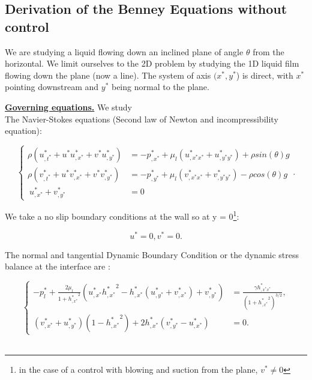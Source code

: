 \documentclass[12pt]{article}
\begin{document}
\subsection{Derivation of the Benney Equations without control}

We are studying a liquid flowing down an inclined plane of angle $\theta$ from the horizontal. We limit ourselves to 
the 2D problem by studying the 1D liquid film flowing down the plane (now a line). 
The system of axis $(x^*, y^*$) is direct, with $x^*$ pointing downstream and $y^*$ being normal to the plane. 

\vspace{0.5cm}
{\underline{\textbf{Governing equations.}}}
We study\\ 

The Navier-Stokes equations (Second law of Newton and incompressibility equation):

\begin{equation}
\left\{
\begin{aligned}
    \rho(u^*_{,t^*}+u^*u^*_{,x^*}+v^*u^*_{,y^*}) &= -p^*_{,x^*} + \mu_l(u^*_{,x^*x^*} + u^*_{,y^*y^*}) + \rho sin(\theta)g\\
    \rho(v^*_{,t^*}+u^*v^*_{,x^*}+v^*v^*_{,y^*}) &= -p^*_{,y^*} + \mu_l(v^*_{,x^*x^*} + v^*_{,y^*y^*}) - \rho cos(\theta)g\\\
    u^*_{,x^*} + v^*_{,y^*} &= 0 \quad 
\end{aligned}
\right. .
\end{equation}

We take a no slip boundary conditions at the wall so at y = 0\footnote{in the case of a control with blowing and suction from the plane, $v^*\neq 0$ }: 

\begin{equation}
    u^*=0, v^*=0.
\end{equation} 

The normal and tangential Dynamic Boundary Condition or the dynamic stress balance at the interface are : 

\begin{equation}
\left\{
\begin{aligned}
-p^*_l + \frac{2\mu_l}{1+{h^*_{,x^*}}^2}(u^*_{,x^*}{h^*_{,x^*}}^2 - h^*_{,x^*}(u^*_{,y^*} + v^*_{,x^*})+v^*_{,y^*}) &= \frac{\gamma h^*_{,x^*x^*}}{(1+{h^*_{,x^*}}^2)^{3/2}},\\
(v^*_{,x^*} + u^*_{,y^*})(1-{h^*_{,x^*}}^2)+2h^*_{,x^*}(v^*_{,y^*}-u^*_{,x^*})&=0.
\end{aligned}
\right.
\end{equation}
\\
\end{document}
